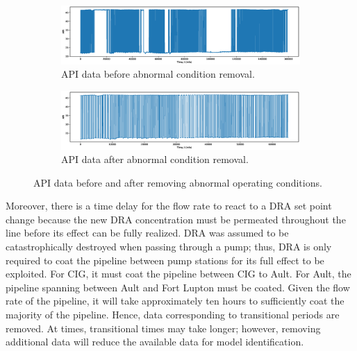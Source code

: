 \begin{figure}[h]
     \centering
     \begin{subfigure}[b]{1.0\textwidth}
         \centering
         \includegraphics[width=\textwidth]{images/08NonFilteredDensity.eps}
         \caption{API data before abnormal condition removal.}
         \label{fig:08APIBefore}
     \end{subfigure}
     \hfill
     \begin{subfigure}[b]{1.0\textwidth}
         \centering
         \includegraphics[width=\textwidth]{images/08FilteredDensity.eps}
         \caption{API data after abnormal condition removal.}
         \label{fig:08APIAfter}
     \end{subfigure}
        \caption{API data before and after removing abnormal operating conditions.}
        \label{fig:08API}
\end{figure}

Moreover, there is a time delay for the flow rate to react to a DRA set point change because the new DRA concentration must be permeated throughout the line before its effect can be fully realized.  DRA was assumed to be catastrophically destroyed when passing through a pump; thus, DRA is only required to coat the pipeline between pump stations for its full effect to be exploited.  For CIG, it must coat the pipeline between CIG to Ault.  For Ault, the pipeline spanning between Ault and Fort Lupton must be coated.  Given the flow rate of the pipeline, it will take approximately ten hours to sufficiently coat the majority of the pipeline. Hence, data corresponding to transitional periods are removed. At times, transitional times may take longer; however, removing additional data will reduce the available data for model identification.  


